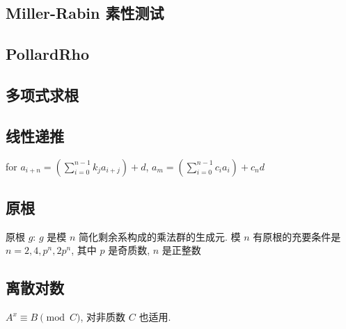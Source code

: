 \documentclass[landscape, twocolumn, 8pt, a4paper, twoside]{extarticle}
\begin{document}
\subsection{Miller-Rabin 素性测试}


\subsection{PollardRho}


\subsection{多项式求根}


\subsection{线性递推}
for $a_{i + n} = (\sum_{i = 0}^{n - 1} k_j a_{i + j}) + d$,
$a_m = (\sum_{i = 0}^{n - 1} c_i a_i) + c_n d$


\subsection{原根}
原根 $g$: $g$ 是模 $n$ 简化剩余系构成的乘法群的生成元.
模 $n$ 有原根的充要条件是 $n = 2, 4, p^n, 2p^n$, 其中 $p$ 是奇质数, $n$ 是正整数


\subsection{离散对数}
$A ^ x \equiv B \pmod{C}$, 对非质数 $C$ 也适用.

\end{document}
